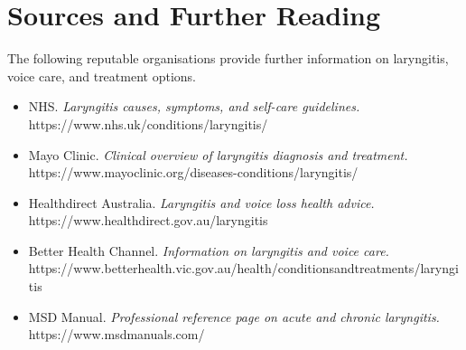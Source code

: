 \section*{Sources and Further Reading}
The following reputable organisations provide further information on laryngitis, voice care, and treatment options.
\begin{itemize}
    \item NHS. \textit{Laryngitis causes, symptoms, and self-care guidelines.} https://www.nhs.uk/conditions/laryngitis/
    \item Mayo Clinic. \textit{Clinical overview of laryngitis diagnosis and treatment.} https://www.mayoclinic.org/diseases-conditions/laryngitis/
    \item Healthdirect Australia. \textit{Laryngitis and voice loss health advice.} https://www.healthdirect.gov.au/laryngitis
    \item Better Health Channel. \textit{Information on laryngitis and voice care.} https://www.betterhealth.vic.gov.au/health/conditionsandtreatments/laryngitis
    \item MSD Manual. \textit{Professional reference page on acute and chronic laryngitis.} https://www.msdmanuals.com/
\end{itemize}
